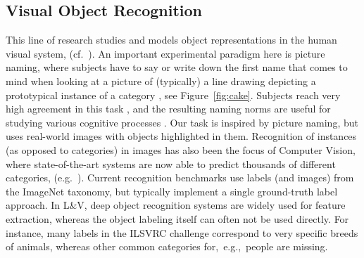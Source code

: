 \documentclass[10pt, a4paper]{article}
\newcommand{\cs}[1]{\textcolor{green!60!black}{\emph{//cs: #1//}}}
\begin{document}
\subsection{Visual Object Recognition}

This line of research studies and models object representations in the human visual system, (cf.\ ). 
An important experimental paradigm here is picture naming, where subjects have to say or write down the first name that comes to mind when looking at a picture of (typically) a line drawing depicting a prototypical instance of a category \cite{snodgrass}, see Figure\ \ref{fig:cake}.
Subjects reach very high agreement in this task \cite{rossion2004revisiting}, and the resulting naming norms are useful for studying various cognitive processes \cite{humphreys1988cascade}.
Our task is inspired by picture naming, but uses real-world images with objects highlighted in them.
Recognition of instances (as opposed to categories) in images has also been the focus of Computer Vision, where state-of-the-art systems are now able to predict thousands of different categories, (e.g.\ ). 
Current recognition benchmarks use labels (and images) from the ImageNet \cite{imagenet_cvpr09} taxonomy, but typically implement a single ground-truth label approach. 
In L\&V, deep object recognition systems are widely used for feature extraction, whereas the object labeling itself can often not be used directly. For instance, many labels in the ILSVRC  challenge \cite{ILSVRC15} correspond to very specific breeds of animals, whereas other common categories  for,\ e.g.,\ people are missing.
\end{document}
